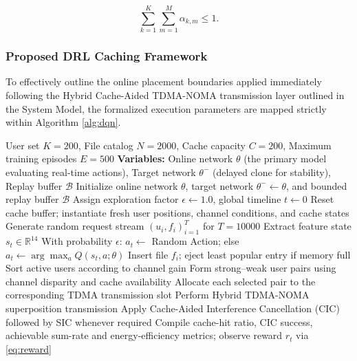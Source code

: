 \documentclass[12pt,a4paper]{article}
\begin{document}
\begin{equation}
\sum_{k=1}^{K}
\sum_{m=1}^{M}
\alpha_{k,m}
\le 1.
\end{equation}


\subsubsection{Proposed DRL Caching Framework}

To effectively outline the online placement boundaries applied immediately following the Hybrid Cache-Aided TDMA-NOMA transmission layer outlined in the System Model, the formalized execution parameters are mapped strictly within Algorithm \ref{alg:dqn}.

\begin{algorithm}
\caption{Hybrid Cache-Aware TDMA-NOMA Double Dueling DQN Cache Training}
\label{alg:dqn}
\begin{algorithmic}[1]
\REQUIRE User set $K=200$, File catalog $N=2000$, Cache capacity $C=200$, Maximum training episodes $E = 500$
\STATE \textbf{Variables:} Online network $\theta$ (the primary model evaluating real-time actions), Target network $\theta^-$ (delayed clone for stability), Replay buffer $\mathcal{B}$
\STATE Initialize online network $\theta$, target network $\theta^- \leftarrow \theta$, and bounded replay buffer $\mathcal{B}$
\STATE Assign exploration factor $\epsilon \leftarrow 1.0$, global timeline $t \leftarrow 0$
    \STATE Reset cache buffer; instantiate fresh user positions, channel conditions, and cache states
    \STATE Generate random request stream $(u_i, f_i)_{i=1}^{T}$ for $T=10000$
        \STATE Extract feature state $s_t \in \mathbb{R}^{14}$
        \STATE With probability $\epsilon$: $a_t \leftarrow$ Random Action; else $a_t \leftarrow \arg\max_a Q(s_t, a; \theta)$
            \STATE Insert file $f_i$; eject least popular entry if memory full
        \ENDIF
        \STATE Sort active users according to channel gain
        \STATE Form strong--weak user pairs using channel disparity and cache availability
        \STATE Allocate each selected pair to the corresponding TDMA transmission slot
        \STATE Perform Hybrid TDMA-NOMA superposition transmission
        \STATE Apply Cache-Aided Interference Cancellation (CIC) followed by SIC whenever required
        \STATE Compile cache-hit ratio, CIC success, achievable sum-rate and energy-efficiency metrics; observe reward $r_t$ via \eqref{eq:reward}

\end{algorithmic}
\end{algorithm}
\end{document}
